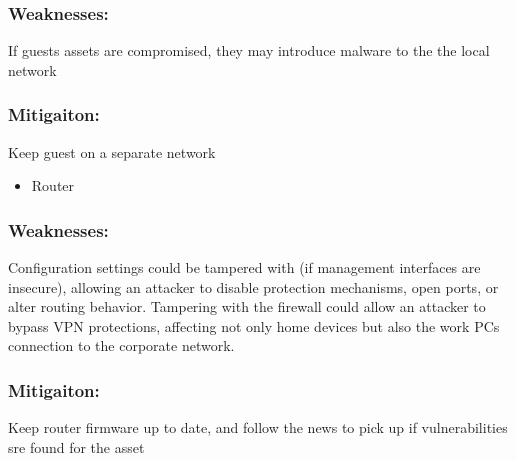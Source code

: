 \documentclass[
	letterpaper, %
	10pt, %
	unnumberedsections, %
	twoside, %
]{APAAssignment}
\begin{document}
\begin{singlespace}
	\subsubsection{Weaknesses:} If guests assets are compromised, they may introduce malware to the the local network  
	\subsubsection{Mitigaiton:} Keep guest on a separate network
	
	\begin{itemize}
		\item Router
	\end{itemize}
	
	\subsubsection{Weaknesses:} Configuration settings could be tampered with (if management interfaces are insecure), allowing an attacker to disable protection mechanisms, open ports, or alter routing behavior. Tampering with the firewall could allow an attacker to bypass VPN protections, affecting not only home devices but also the work PCs connection to the corporate network.
	\subsubsection{Mitigaiton:} Keep router firmware up to date, and follow the news to pick up if vulnerabilities sre found for the asset
	
	
\end{singlespace}
	
\end{document}
